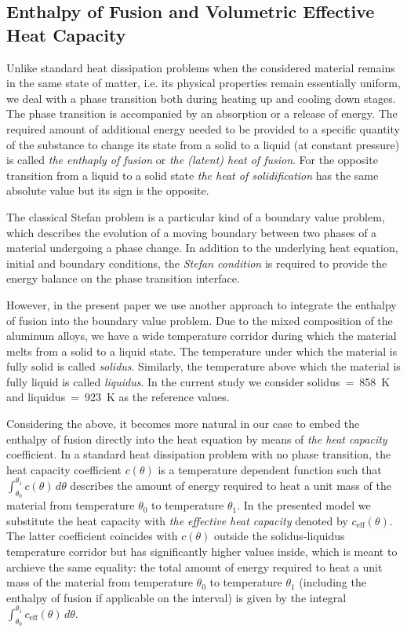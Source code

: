 \subsection{Enthalpy of Fusion and Volumetric Effective Heat Capacity}
\label{subsec:capacity}

Unlike standard heat dissipation problems when the considered material remains in the same state of matter, i.e. its physical properties remain essentially uniform, we deal with a phase transition both during heating up and cooling down stages. The phase transition is accompanied by an absorption or a release of energy. The required amount of additional energy needed to be provided to a specific quantity of the substance to change its state from a solid to a liquid (at constant pressure) is called \emph{the enthaply of fusion} or \emph{the (latent) heat of fusion}. For the opposite transition from a liquid to a solid state \emph{the heat of solidification} has the same absolute value but its sign is the opposite.

The classical Stefan problem  is a particular kind of a boundary value problem, which describes the evolution of a moving boundary between two phases of a material undergoing a phase change. In addition to the underlying heat equation, initial and boundary conditions, the \emph{Stefan condition} is required to provide the energy balance on the phase transition interface.

However, in the present paper we use another approach to integrate the enthalpy of fusion into the boundary value problem. Due to the mixed composition of the aluminum alloys, we have a wide temperature corridor during which the material melts from a solid to a liquid state. The temperature under which the material is fully solid is called \emph{solidus}. Similarly, the temperature above which the material is fully liquid is called \emph{liquidus}. In the current study we consider solidus~=~\SI{858}{\K} and liquidus~=~\SI{923}{K} as the reference values.

Considering the above, it becomes more natural in our case to embed the enthalpy of fusion directly into the heat equation by means of \emph{the heat capacity} coefficient. In a standard heat dissipation problem with no phase transition, the heat capacity coefficient $c(\theta)$ is a temperature dependent function such that $\int_{\theta_0}^{\theta_1} c(\theta)\, d\theta$ describes the amount of energy required to heat a unit mass of the material from temperature $\theta_0$ to temperature $\theta_1$. In the presented model we substitute the heat capacity with \emph{the effective heat capacity} denoted by $c_{\text{eff}}(\theta)$. The latter coefficient coincides with $c(\theta)$ outside the solidus-liquidus temperature corridor but has significantly higher values inside, which is meant to archieve the same equality: the total amount of energy required to heat a unit mass of the material from temperature $\theta_0$ to temperature $\theta_1$ (including the enthalpy of fusion if applicable on the interval) is given by the integral $\int_{\theta_0}^{\theta_1} c_{\text{eff}}(\theta)\, d\theta$.

